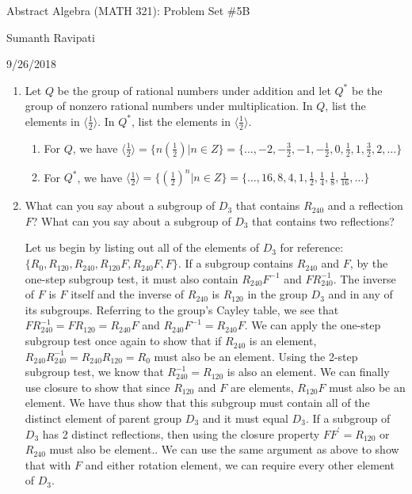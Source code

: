 \documentclass{article}
\begin{document}
%
\centerline{\Large Abstract Algebra (MATH 321): Problem Set \#5B}
\centerline{Sumanth Ravipati}
\centerline{9/26/2018}
\vspace{.25in}

\begin{enumerate}
    \item Let $Q$ be the group of rational numbers under addition and let $Q^*$ be the group of nonzero rational numbers under multiplication. In $Q$, list the elements in $\langle\frac{1}{2}\rangle$. In $Q^*$, list the elements in $\langle\frac{1}{2}\rangle$.
    \begin{enumerate}
        \item For $Q$, we have $\langle\frac{1}{2}\rangle = \{n(\frac{1}{2}) | n \in Z\} = \{\ldots, -2, -\frac{3}{2}, -1, -\frac{1}{2}, 0, \frac{1}{2}, 1, \frac{3}{2}, 2, \ldots\}$
        \item For $Q^*$, we have $\langle\frac{1}{2}\rangle = \{(\frac{1}{2})^n | n \in Z\} = \{\ldots, 16, 8, 4, 1, \frac{1}{2}, \frac{1}{4}, \frac{1}{8}, \frac{1}{16}, \ldots\}$
    \end{enumerate}
    \item What can you say about a subgroup of $D_3$ that contains $R_{240}$ and a reflection $F$? What can you say about a subgroup of $D_3$ that contains two reflections?
    \begin{flushleft}
    Let us begin by listing out all of the elements of $D_3$ for reference: $\{R_0, R_{120}, R_{240}, R_{120}F, R_{240}F, F\}$. If a subgroup contains $R_{240}$ and $F$, by the one-step subgroup test, it must also contain $R_{240}F^{-1}$ and $FR_{240}^{-1}$. The inverse of $F$ is $F$ itself and the inverse of $R_{240}$ is $R_{120}$ in the group $D_3$ and in any of its subgroups. Referring to the group's Cayley table, we see that $FR_{240}^{-1} = FR_{120} = R_{240}F$ and $R_{240}F^{-1} = R_{240}F$. We can apply the one-step subgroup test once again to show that if $R_{240}$ is an element, $R_{240}R_{240}^{-1} = R_{240}R_{120} = R_0$ must also be an element. Using the 2-step subgroup test, we know that $R_{240}^{-1} = R_{120}$ is also an element. We can finally use closure to show that since $R_{120}$ and $F$ are elements, $R_{120}F$ must also be an element. We have thus show that this subgroup must contain all of the distinct element of parent group $D_3$ and it must equal $D_3$.\newline
    If a subgroup of $D_3$ has 2 distinct reflections, then using the closure property $FF^\prime = R_{120}$ or $R_{240}$ must also be element.. We can use the same argument as above to show that with $F$ and either rotation element, we can require every other element of $D_3$.

\end{flushleft}
\end{enumerate}
\end{document}
